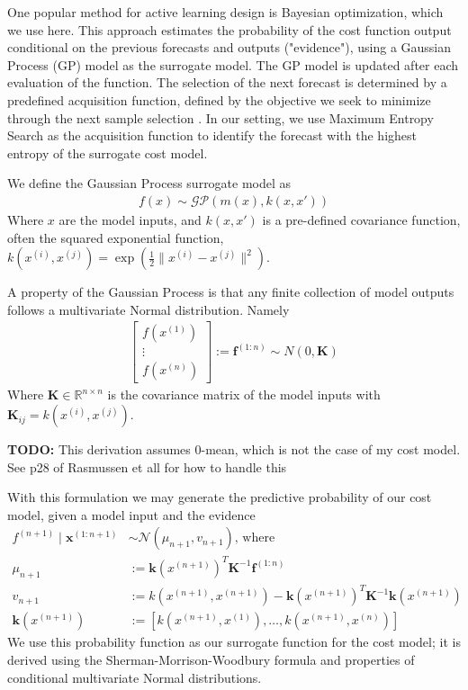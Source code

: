 \documentclass[10pt,twocolumn,letterpaper]{article}
\begin{document}
One popular method for active learning design is Bayesian optimization, which we use here. This approach estimates the probability of the cost function output conditional on the previous forecasts and outputs ("evidence"), using a Gaussian Process (GP) model as the surrogate model. The GP model is updated after each evaluation of the function. The selection of the next forecast is determined by a predefined acquisition function, defined by the objective we seek to minimize through the next sample selection \cite{brochu2010tutorial} \cite{wang2022intuitive}. In our setting, we use Maximum Entropy Search as the acquisition function to identify the forecast with the highest entropy of the surrogate cost model.

We define the Gaussian Process surrogate model as
\begin{align*}
    f(x) \sim \mathcal{GP}(m(x), k(x, x'))
\end{align*}
Where $x$ are the model inputs, and $k(x, x')$ is a pre-defined covariance function, often the squared exponential function, $k(x^{(i)}, x^{(j)}) = \exp\left(\frac{1}{2}\lVert x^{(i)} - x^{(j)}\rVert^2\right)$. 

A property of the Gaussian Process is that any finite collection of model outputs follows a multivariate Normal distribution. Namely
\begin{align*}
    \begin{bmatrix}
        f(x^{(1)})\\\vdots\\f(x^{(n)})
    \end{bmatrix} := \textbf{f}^{(1:n)} \sim N(0, \textbf{K})
\end{align*}
Where $\textbf{K}\in \mathbb{R}^{n\times n}$ is the covariance matrix of the model inputs with $\textbf{K}_{ij} = k(x^{(i)}, x^{(j)})$.

\textbf{TODO:} This derivation assumes 0-mean, which is not the case of my cost model. See p28 of Rasmussen et all for how to handle this \cite{Rasmussen}

With this formulation we may generate the predictive probability of our cost model, given a model input and the evidence
\begin{align*}
    f^{(n+1)} \mid \textbf{x}^{(1:n+1)} &\sim \mathcal{N}(\mu_{n+1}, v_{n+1}) \textrm{, where}\\
    \mu_{n+1} &:= \textbf{k}(x^{(n+1)})^T\textbf{K}^{-1}\textbf{f}^{(1:n)}\\
    v_{n+1} &:= k(x^{(n+1)}, x^{(n+1)}) - \textbf{k}(x^{(n+1)})^T\textbf{K}^{-1}\textbf{k}(x^{(n+1)})\\
    \textbf{k}(x^{(n+1)}) &:= \left[k(x^{(n+1)}, x^{(1)}), \dots, k(x^{(n+1)}, x^{(n)})\right]
\end{align*}
We use this probability function as our surrogate function for the cost model; it is derived using the Sherman-Morrison-Woodbury formula and properties of conditional multivariate Normal distributions. 
\end{document}
